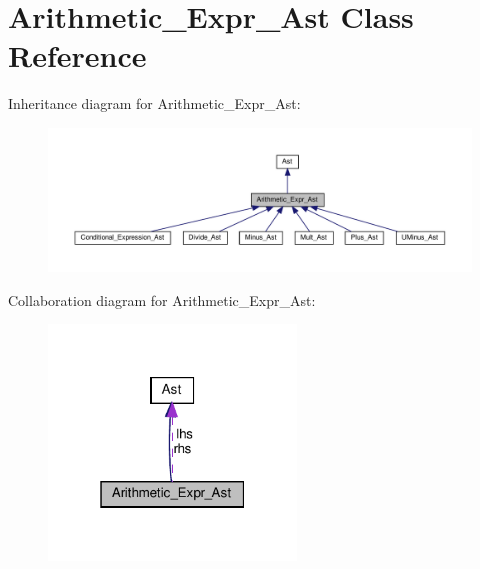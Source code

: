 \hypertarget{classArithmetic__Expr__Ast}{}\section{Arithmetic\+\_\+\+Expr\+\_\+\+Ast Class Reference}
\label{classArithmetic__Expr__Ast}


Inheritance diagram for Arithmetic\+\_\+\+Expr\+\_\+\+Ast\+:
\nopagebreak
\begin{figure}[H]
\begin{center}
\leavevmode
\includegraphics[width=350pt]{classArithmetic__Expr__Ast__inherit__graph}
\end{center}
\end{figure}


Collaboration diagram for Arithmetic\+\_\+\+Expr\+\_\+\+Ast\+:
\nopagebreak
\begin{figure}[H]
\begin{center}
\leavevmode
\includegraphics[width=187pt]{classArithmetic__Expr__Ast__coll__graph}
\end{center}
\end{figure}
